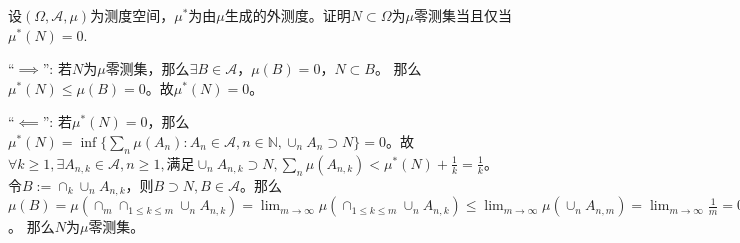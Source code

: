 \documentclass{ctexart}
\begin{document}
\begin{problem}\label{pro:23}
 设\((\Omega,\mathcal{A},\mu) \)为测度空间，\(\mu^* \)为由\(\mu \)生成的外测度。证明\(N \subset \Omega \)为\(\mu  \)零测集当且仅当\(\mu^*(N)=0 \). 
\end{problem}
\begin{solution}
``\(\implies\)'': 若\(N \)为\(\mu \)零测集，那么\(\exists B \in \mathcal{A} \)，\(\mu(B)=0 \)，\(N \subset B \)。
那么\(\mu^*(N) \leq \mu(B)=0 \)。故\(\mu^*(N)=0 \)。 

``\(\impliedby\)'': 若\(\mu^*(N)=0 \)，那么\(\mu^*(N)=\inf\{\sum_{n}\mu(A_n):A_n \in \mathcal{A}, n \in \mathbb{N}, \cup_n A_n \supset N\}=0\)。故\(\forall k  \geq 1, \exists A_{n,k} \in \mathcal{A}, n  \geq 1, \)满足\(\cup_n A_{n,k} \supset N, \sum_{n}\mu(A_{n,k}) < \mu^*(N) + \frac{1}{k}=\frac{1}{k} \)。
令\(B := \cap_k \cup_n A_{n,k} \)，则\(B \supset N, B \in \mathcal{A} \)。那么\(\mu(B)=\mu(\cap_{m} \cap_{ 1 \leq k \leq m} \cup_{n}A_{n,k})=\lim_{m \to \infty}\mu(\cap_{1 \leq k \leq m} \cup_n A_{n,k}) \leq \lim_{m \to \infty} \mu(\cup_n A_{n,m}) = \lim_{m \to \infty} \frac{1}{m} =0  \)。
那么\(N \)为\(\mu \)零测集。
\end{solution}
\end{document}
